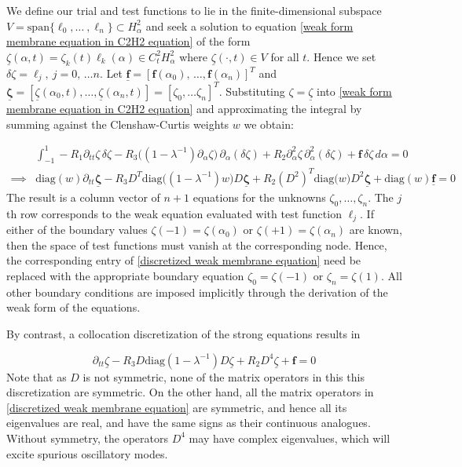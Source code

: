 \documentclass{article}[12pt]
\theoremstyle{Theorem}
\begin{document}
We define our trial and test functions to lie in the finite-dimensional subspace $V =\text{span}\{\ell_0,\ldots\ ,\ell_n\} \subset H^2_\alpha$ and seek a solution to equation \eqref{weak form membrane equation in C2H2 equation} of the form $\underline{\zeta}(\alpha, t) = \zeta_k(t)\ell_k(\alpha)\in C^2_tH^2_\alpha$ where $\underline{\zeta}(\cdot,t) \in V$ for all $t$. Hence we set $\delta\zeta = \ell_j,\ j = 0,\, \ldots n$. Let $\underline{\boldsymbol{f}} = [\boldsymbol{f}(\alpha_0),\,\ldots,\boldsymbol{f}(\alpha_n)]^T$ and $\underline{\boldsymbol{\zeta}} =[\underline{\zeta}(\alpha_0,t),\ldots, \underline{\zeta}(\alpha_n,t)] =[\zeta_0,\ldots\zeta_n]^T $. Substituting $\zeta = \underline{\zeta}$ into \eqref{weak form membrane equation in C2H2 equation} and approximating the integral by summing against the Clenshaw-Curtis weights $w$ we obtain:

\begin{align}
&\int_{-1}^1-R_1
\partial_{tt}\zeta\, \delta\zeta 
-R_3\big((1-\lambda^{-1})\partial_\alpha\zeta\big)\, \partial_\alpha(\delta\zeta) + R_2\partial_\alpha^2\zeta\, \partial_\alpha^2(\delta\zeta) 
+\boldsymbol{f}\, \delta\zeta \,d\alpha = 0\\
\implies &\textrm{diag}(w)\partial_{tt}\underline{\boldsymbol{\zeta}}  
-R_3D^T\textrm{diag}\big((1-\lambda^{-1})w)D\underline{\boldsymbol{\zeta}}+ R_2 (D^2)^T\textrm{diag}\big(w)D^2\underline{\boldsymbol{\zeta}}  + \textrm{diag}(w)\underline{\boldsymbol{f}}  = 0
\label{discretized weak membrane equation}
\end{align}
The result is a column vector of $n+1$ equations for the unknowns $\zeta_0,\ldots,\zeta_n$. The $j$th row corresponds to the weak equation evaluated with test function $\ell_j$. If either of the boundary values $\zeta(-1) = \zeta(\alpha_0)$ or $\zeta(+1) = \zeta(\alpha_n)$ are known, then the space of test functions must vanish at the corresponding node. Hence, the corresponding entry  of \eqref{discretized weak membrane equation} need be replaced with the appropriate boundary equation $\zeta_{0} = \zeta(-1)$ or $\zeta_{n} = \zeta(1)$.  All other boundary conditions are imposed implicitly through the derivation of the weak form of the equations.
\newline

By contrast, a collocation discretization of the strong equations results in 

\begin{equation}
    \partial_{tt}\underline{\zeta} -R_3D\textrm{diag}(1-\lambda^{-1})D\underline{\zeta} +R_2D^4\underline{\zeta} + \boldsymbol{f} = 0
    \label{collocation discretization of strong equations}
\end{equation}
Note that as $D$ is not symmetric, none of the matrix operators in this this discretization are symmetric. On the other hand, all the matrix operators in \eqref{discretized weak membrane equation} are symmetric, and hence all its eigenvalues are real, and have the same signs as their continuous analogues. Without symmetry, the operators $D^4$ may have complex eigenvalues, which will excite spurious oscillatory modes. 
\end{document}
